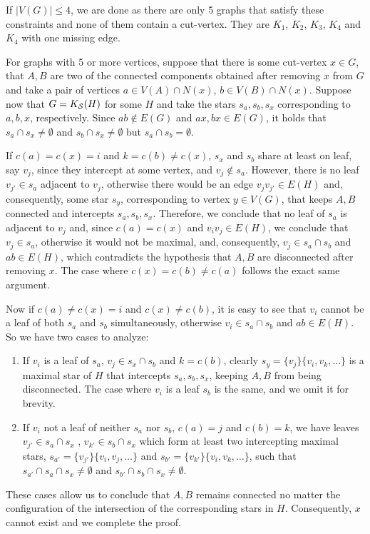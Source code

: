 \begin{tproof}
    If $|V(G)| \leq 4$, we are done as there are only 5 graphs that satisfy these constraints and none of them contain a cut-vertex.
    They are $K_1$, $K_2$, $K_3$, $K_4$ and $K_4$ with one missing edge.
    
    For graphs with 5 or more vertices, suppose that there is some cut-vertex $x \in G$, that $A,B$ are two of the connected components obtained after removing $x$ from $G$ and take a pair of vertices $a \in V(A) \cap N(x)$, $b \in V(B) \cap N(x)$.
    Suppose now that $G = K_{\mathcal{S}}(H)$ for some $H$ and take the stars $s_a, s_b, s_x$ corresponding to $a, b, x$, respectively.
    Since $ab \notin E(G)$ and $ax, bx \in E(G)$, it holds that $s_a \cap s_x \neq \emptyset$ and $s_b \cap s_x \neq \emptyset$ but $s_a \cap s_b = \emptyset$.
    
    If $c(a) = c(x) = i$ and $k = c(b) \neq c(x)$, $s_x$ and $s_b$ share at least on leaf, say $v_j$, since they intercept at some vertex, and $v_j \notin s_a$.
    However, there is no leaf $v_{j'} \in s_a$ adjacent to $v_j$, otherwise there would be an edge $v_jv_{j'} \in E(H)$ and, consequently, some star $s_y$, corresponding to vertex $y \in V(G)$, that keeps $A,B$ connected and intercepts $s_a, s_b, s_x$.
    Therefore, we conclude that no leaf of $s_a$ is adjacent to $v_j$ and, since $c(a) = c(x)$ and $v_iv_j \in E(H)$, we conclude that $v_j \in s_a$, otherwise it would not be maximal, and, consequently, $v_j \in s_a \cap s_b$ and $ab \in E(H)$, which contradicts the hypothesis that $A,B$ are disconnected after removing $x$.
    The case where $c(x) = c(b) \neq c(a)$ follows the exact same argument.
    
    Now if $c(a) \neq c(x) = i$ and $c(x) \neq c(b)$, it is easy to see that $v_i$ cannot be a leaf of both $s_a$ and $s_b$ simultaneously, otherwise $v_i \in s_a \cap s_b$ and $ab \in E(H)$.
    So we have two cases to analyze:
    \begin{enumerate}
        \item If $v_i$ is a leaf of $s_a$, $v_j \in s_x \cap s_b$ and $k = c(b)$, clearly $s_y = \{v_j\}\{v_i, v_k, \dots \}$ is a maximal star of $H$ that intercepts $s_a, s_b, s_x$, keeping $A,B$ from being disconnected.
        The case where $v_i$ is a leaf $s_b$ is the same, and we omit it for brevity.
        \item If $v_i$ not a leaf of neither $s_a$ nor $s_b$, $c(a) = j$ and $c(b) = k$, we have leaves $v_{j'} \in s_a \cap s_x$ , $v_{k'} \in s_b \cap s_x$ which form at least two intercepting maximal stars, $s_{a'} = \{v_{j'}\}\{v_i, v_j, \dots\}$ and $s_{b'} = \{v_{k'}\}\{v_i, v_k, \dots\}$, such that $s_{a'} \cap s_a \cap s_x \neq \emptyset$ and $s_{b'} \cap s_b \cap s_x \neq \emptyset$.
    \end{enumerate}
    
    These cases allow us to conclude that $A,B$ remains connected no matter the configuration of the intersection of the corresponding stars in $H$.
    Consequently, $x$ cannot exist and we complete the proof.
\end{tproof}

